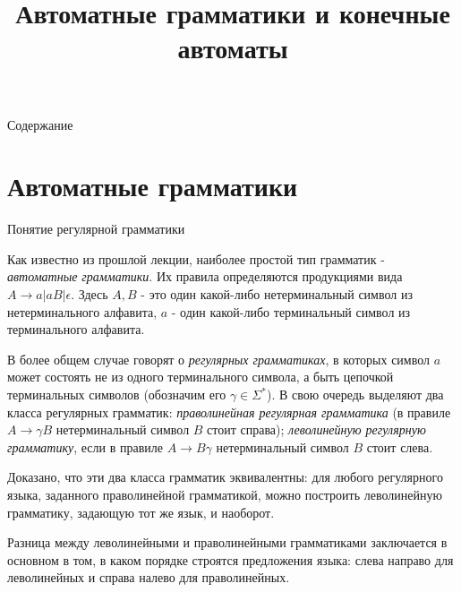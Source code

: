 \documentclass[12pt, pdf, hyperref={unicode},handout]{beamer}
\title[Лекция 2]{\Huge{Автоматные грамматики и конечные автоматы}}
\author[\textcopyright   Артамонов Ю.Н.]{}
\institute[]{}
\date{}
\begin{document}
\begin{frame}
  \titlepage
\end{frame}

\begin{frame}{Содержание}
  \tableofcontents
\end{frame}

\section{Автоматные грамматики}


\begin{frame}{Понятие регулярной грамматики}
  \begin{block}

    \small{
      Как известно из прошлой лекции, наиболее простой тип грамматик - \textit{автоматные грамматики}. Их правила определяются продукциями вида $A\rightarrow a|aB|\epsilon$.  Здесь $A, B$ - это один какой-либо нетерминальный символ из нетерминального алфавита, $a$ - один какой-либо терминальный символ из терминального алфавита.

      В более общем случае говорят о \textit{регулярных грамматиках}, в которых символ $a$ может состоять не из одного терминального символа, а быть цепочкой терминальных символов (обозначим его $\gamma\in \Sigma^*$). В свою очередь выделяют два класса регулярных грамматик: \textit{праволинейная регулярная грамматика} (в правиле $A\rightarrow \gamma B$ нетерминальный символ $B$ стоит справа);  \textit{леволинейную регулярную грамматику}, если в правиле $A\rightarrow B \gamma$ нетерминальный символ $B$ стоит слева.

      Доказано, что эти два класса грамматик эквивалентны: для любого регулярного языка, заданного праволинейной грамматикой, можно построить леволинейную грамматику, задающую тот же язык, и наоборот.

      Разница между леволинейными и праволинейными грамматиками заключается в основном в том, в каком порядке строятся предложения языка: слева направо для леволинейных и справа налево для праволинейных.


}

  \end{block}
  
\end{frame}
\end{document}
